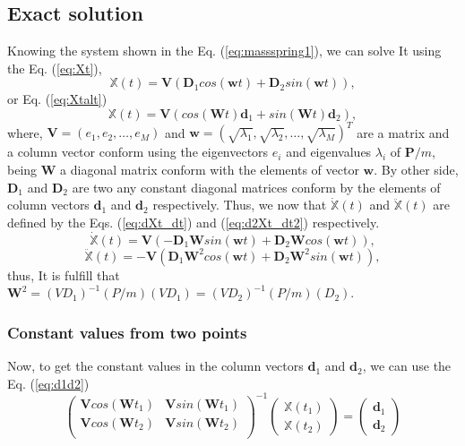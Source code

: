 \documentclass[review]{elsarticle}
\begin{document}
\subsection{Exact solution}
Knowing the system shown in the Eq. (\ref{eq:massspring1}), we can solve It
using the Eq. (\ref{eq:Xt}),
\begin{equation}\label{eq:Xt}
 \mathbb{X}(t)= \mathbf{V}\left(\mathbf{D}_1 cos(\mathbf{w}t) + \mathbf{D}_2 sin(\mathbf{w}t) \right),
\end{equation}
or Eq. (\ref{eq:Xtalt})
\begin{equation}\label{eq:Xtalt}
 \mathbb{X}(t)= \mathbf{V}\left( cos(\mathbf{W}t)\mathbf{d}_1 +  sin(\mathbf{W}t)\mathbf{d}_2 \right),
\end{equation}
where, $\mathbf{V}=\left( e_1,e_2,\dots ,e_M\right)$ and 
$\mathbf{w}=\left( \sqrt{\lambda_1},\sqrt{\lambda_2},\dots ,\sqrt{\lambda_M}\right)^{T}$ 
are a matrix and a column 
vector conform using the eigenvectors $e_i$ and eigenvalues $\lambda_i$ of
$\mathbf{P}/m$, being $\mathbf{W}$ a diagonal matrix conform with the elements of vector $\mathbf{w}$.
By other side, $\mathbf{D}_1$ and $\mathbf{D}_2$ are two any constant diagonal matrices
conform by the elements of column vectors $\mathbf{d}_1$ and $\mathbf{d}_2$ respectively.
Thus, we now that $\dot{\mathbb{X}}(t)$ and $\ddot{\mathbb{X}}(t)$ are defined by the Eqs. (\ref{eq:dXt_dt})
and (\ref{eq:d2Xt_dt2}) respectively.
\begin{equation}\label{eq:dXt_dt}
 \dot{\mathbb{X}}(t)= \mathbf{V}\left(-\mathbf{D}_1 \mathbf{W} sin(\mathbf{w}t) + \mathbf{D}_2 \mathbf{W} cos(\mathbf{w}t) \right),
\end{equation}
\begin{equation}\label{eq:d2Xt_dt2}
 \ddot{\mathbb{X}}(t)= -\mathbf{V}\left(\mathbf{D}_1 \mathbf{W}^2 cos(\mathbf{w}t) + \mathbf{D}_2 \mathbf{W}^2 sin(\mathbf{w}t) \right),
\end{equation}
thus, It is fulfill that $\mathbf{W}^2=(V D_1)^{-1}(P/m)(V D_1)=(V D_2)^{-1}(P/m)( D_2)$.

\subsubsection{Constant values from two points}
Now, to get the constant values in the column vectors $\mathbf{d}_1$ and $\mathbf{d}_2$, we can
use the Eq. (\ref{eq:d1d2})
\begin{equation}\label{eq:d1d2}
  \left( 
 \begin{matrix}
\mathbf{V}cos(\mathbf{W}t_1) & \mathbf{V}sin(\mathbf{W}t_1)\\
\mathbf{V}cos(\mathbf{W}t_2) & \mathbf{V}sin(\mathbf{W}t_2)\\
 \end{matrix}
 \right)^{-1}
 \left( 
 \begin{matrix}
\mathbb{X}(t_1) \\
\mathbb{X}(t_2)
 \end{matrix}
 \right)=
  \left( 
 \begin{matrix}
\mathbf{d}_1 \\
\mathbf{d}_2
 \end{matrix}
 \right)
\end{equation}
\end{document}
